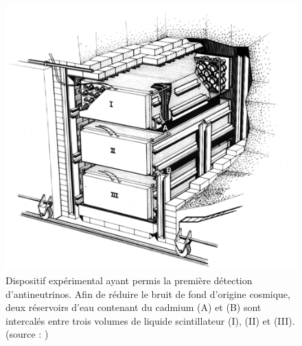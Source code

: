 {\begin{figure}[h!]
  \centering
  \includegraphics[width=0.6\linewidth]{images/cowan_reines_definitive_experiment.png}
  \caption[Dispositif expérimental ayant permis la première détection d'antineutrinos]{Dispositif expérimental ayant permis la première détection d'antineutrinos. Afin de réduire le bruit de fond d'origine cosmique, deux réservoirs d'eau contenant du cadmium (A) et (B) sont intercalés entre trois volumes de liquide scintillateur (I), (II) et (III). (source : \cite{Reines:1960pr})}\label{fig:cowan_reines_definitive_experiment.png}
\end{figure}

}

